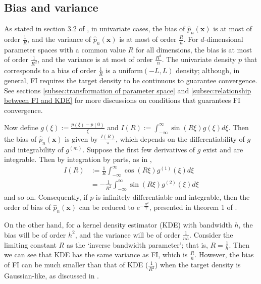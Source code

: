 \documentclass[%
 reprint,
 amsmath,amssymb,
 aps,
]{revtex4-2}
\begin{document}
%
\subsection{\label{subsec:FI bias and variance} Bias and variance}
%
As stated in section 3.2 of \cite{rotiroti2022computing}, in univariate cases, the bias of $\hat{p}_n(\mathbf{x})$ is at most of order $\frac{1}{R}$, and the variance of $\hat{p}_n(\mathbf{x})$ is at most of order $\frac{R}{n}$. For $d$-dimensional parameter spaces with a common value $R$ for all dimensions, the bias is at most of order $\frac{1}{R^d}$, and the variance is at most of order $\frac{R^d}{n}$. The univariate density $p$ that corresponds to a bias of order $\frac{1}{R}$ is a uniform$(-L, L)$ density; although, in general, FI requires the target density to be continuous to guarantee convergence. See sections \ref{subsec:transformation of parameter space} and \ref{subsec:relationship between FI and KDE} for more discussions on conditions that guarantees FI convergence.

Now define $\displaystyle g(\xi) := \frac{p(\xi) - p(0)}{\xi}$ and $\displaystyle I(R) := \int_{-\infty}^\infty \sin(R\xi)g(\xi)d\xi$. Then the bias of $\hat{p}_n(\mathbf{x})$ is given by $\displaystyle \frac{I(R)}{\pi}$, which depends on the differentiability of $g$ and integrability of $g^{(m)}$. Suppose the first few derivatives of $g$ exist and are integrable. Then by integration by parts, as in \cite{rotiroti2022computing},
\begin{align*}
    I(R) & := \frac{1}{R} \int_{-\infty}^\infty \cos(R\xi)g^{(1)}(\xi)d\xi \\
    & = -\frac{1}{R^2} \int_{-\infty}^\infty \sin(R\xi)g^{(2)}(\xi)d\xi
\end{align*}
and so on. Consequently, if $p$ is infinitely differentiable and integrable, then the order of bias of $\hat{p}_n(\mathbf{x})$ can be reduced to $e^{-\frac{R^2}{2}}$, presented in theorem 1 of \cite{rotiroti2022computing}.

On the other hand, for a kernel density estimator (KDE) with bandwidth $h$, the bias will be of order $h^2$, and the variance will be of order $\frac{1}{nh}$. Consider the limiting constant $R$ as the `inverse bandwidth parameter'; that is, $R = \frac{1}{h}$. Then we can see that KDE has the same variance as FI, which is $\frac{R}{n}$. However, the bias of FI can be much smaller than that of KDE ($\frac{1}{R^2}$) when the target density is Gaussian-like, as discussed in \cite{rotiroti2022computing}.
\end{document}

